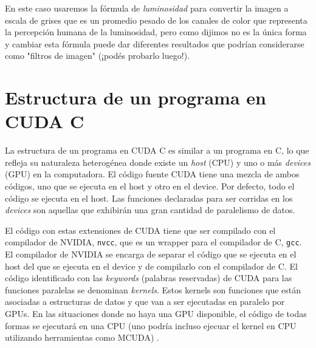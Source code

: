 En este caso usaremos la fórmula de \textit{luminosidad} para convertir la imagen a escala de grises que es un promedio
pesado de los canales de color que representa la percepción humana de la luminosidad, pero como dijimos no es la única
forma y cambiar esta fórmula puede dar diferentes resultados que podrían considerarse como "filtros de imagen" (¡podés
probarlo luego!).


\section*{Estructura de un programa en CUDA C}

La estructura de un programa en CUDA C es similar a un programa en C, lo que refleja su naturaleza heterogénea donde
existe un \textit{host} (CPU) y uno o más \textit{devices} (GPU) en la computadora. El código fuente CUDA tiene una
mezcla de ambos códigos, uno que se ejecuta en el host y otro en el device. Por defecto, todo el código se ejecuta en el
host. Las funciones declaradas para ser corridas en los \textit{devices} son aquellas que exhibirán una gran cantidad de
paralelismo de datos.

El código con estas extensiones de CUDA tiene que ser compilado con el compilador de NVIDIA, \texttt{nvcc}, que es un
wrapper para el compilador de C, \texttt{gcc}. El compilador de NVIDIA se encarga de separar el código que se ejecuta en
el host del que se ejecuta en el device y de compilarlo con el compilador de C. El código identificado con las
\textit{keywords} (palabras reservadas) de CUDA para las funciones paralelas se denominan \textit{kernels}. Estos
kernels son funciones que están asociadas a estructuras de datos y que van a ser ejecutadas en paralelo por GPUs. En las
situaciones donde no haya una GPU disponible, el código de todas formas se ejecutará en una CPU (uno podría incluso
ejecuar el kernel en CPU utilizando herramientas como MCUDA) \cite{sutter2005}.




